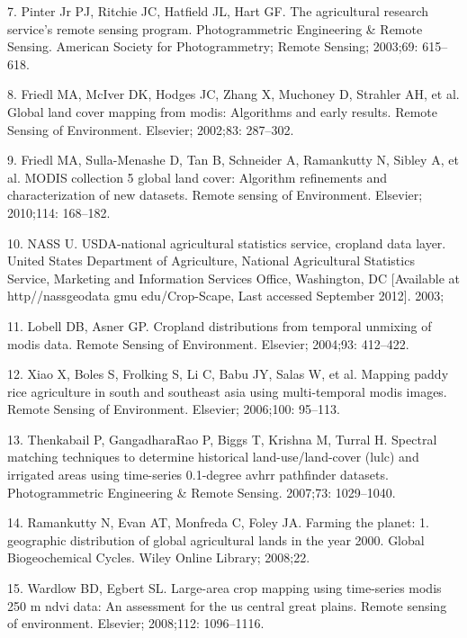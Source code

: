 \documentclass[]{elsarticle} %
\begin{document}
\hypertarget{ref-pinter2003agricultural}{}
7. Pinter Jr PJ, Ritchie JC, Hatfield JL, Hart GF. The agricultural
research service's remote sensing program. Photogrammetric Engineering
\& Remote Sensing. American Society for Photogrammetry; Remote Sensing;
2003;69: 615--618.

\hypertarget{ref-friedl2002global}{}
8. Friedl MA, McIver DK, Hodges JC, Zhang X, Muchoney D, Strahler AH, et
al. Global land cover mapping from modis: Algorithms and early results.
Remote Sensing of Environment. Elsevier; 2002;83: 287--302.

\hypertarget{ref-friedl2010modis}{}
9. Friedl MA, Sulla-Menashe D, Tan B, Schneider A, Ramankutty N, Sibley
A, et al. MODIS collection 5 global land cover: Algorithm refinements
and characterization of new datasets. Remote sensing of Environment.
Elsevier; 2010;114: 168--182.

\hypertarget{ref-nass2003usda}{}
10. NASS U. USDA-national agricultural statistics service, cropland data
layer. United States Department of Agriculture, National Agricultural
Statistics Service, Marketing and Information Services Office,
Washington, DC {[}Available at http//nassgeodata gmu edu/Crop-Scape,
Last accessed September 2012{]}. 2003;

\hypertarget{ref-lobell2004cropland}{}
11. Lobell DB, Asner GP. Cropland distributions from temporal unmixing
of modis data. Remote Sensing of Environment. Elsevier; 2004;93:
412--422.

\hypertarget{ref-xiao2006mapping}{}
12. Xiao X, Boles S, Frolking S, Li C, Babu JY, Salas W, et al. Mapping
paddy rice agriculture in south and southeast asia using multi-temporal
modis images. Remote Sensing of Environment. Elsevier; 2006;100:
95--113.

\hypertarget{ref-thenkabail2007spectral}{}
13. Thenkabail P, GangadharaRao P, Biggs T, Krishna M, Turral H.
Spectral matching techniques to determine historical land-use/land-cover
(lulc) and irrigated areas using time-series 0.1-degree avhrr pathfinder
datasets. Photogrammetric Engineering \& Remote Sensing. 2007;73:
1029--1040.

\hypertarget{ref-ramankutty2008farming}{}
14. Ramankutty N, Evan AT, Monfreda C, Foley JA. Farming the planet: 1.
geographic distribution of global agricultural lands in the year 2000.
Global Biogeochemical Cycles. Wiley Online Library; 2008;22.

\hypertarget{ref-wardlow2008large}{}
15. Wardlow BD, Egbert SL. Large-area crop mapping using time-series
modis 250 m ndvi data: An assessment for the us central great plains.
Remote sensing of environment. Elsevier; 2008;112: 1096--1116.
\end{document}

